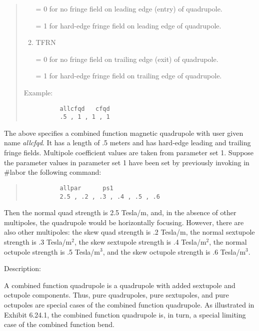\begin{quotation}
\begin{enumerate}
             = 0 for no fringe field on leading edge (entry) of quadrupole.

             = 1 for hard-edge fringe field on leading edge of quadrupole.

      \item  TFRN

             = 0 for no fringe field on trailing edge (exit) of quadrupole.

             = 1 for hard-edge fringe field on trailing edge of quadrupole.
\end{enumerate}

\vspace{5mm}
\noindent     Example:
\begin{verbatim}
          allcfqd   cfqd
          .5 , 1 , 1 , 1
\end{verbatim}
\end{quotation}
The above specifies a combined function magnetic quadrupole with user
given name {\em allcfqd}.  It has a length of .5 meters and has hard-edge
leading and trailing fringe fields.  Multipole coefficient values are
taken from parameter set 1.  Suppose the parameter values in parameter
set 1 have been set by previously invoking in \#labor the following command:
\begin{quotation}
\begin{verbatim}
          allpar      ps1
          2.5 , .2 , .3 , .4 , .5 , .6
\end{verbatim}
\end{quotation}
Then the normal quad strength is 2.5 Tesla/m, and, in the absence of
other multipoles, the quadrupole would be horizontally focusing.
However, there are also other multipoles:  the skew quad strength is .2
Tesla/m, the normal sextupole strength is .3 Tesla/$\mbox{m}^2$,
the skew sextupole strength is .4 Tesla/$\mbox{m}^2$, the normal
octupole strength is .5 Tesla/$\mbox{m}^3$, and the skew octupole
strength is .6 Tesla/$\mbox{m}^3$.

\vspace{5mm}
      Description:
\vspace{2mm}

      A combined function quadrupole is a quadrupole with added sextupole
and octupole components.  Thus, pure quadrupoles, pure sextupoles, and pure
octupoles are special cases of the combined function quadrupole.  As
illustrated in Exhibit 6.24.1, the combined function quadrupole is,
in turn, a special limiting case of the combined function bend.

